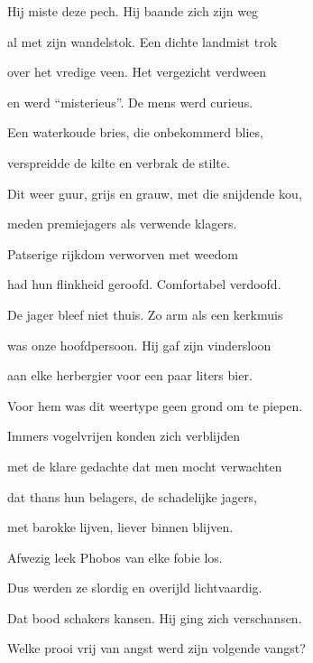 Hij miste deze pech.
Hij baande zich zijn weg

al met zijn wandelstok.
Een dichte landmist trok

over het vredige veen.
Het vergezicht verdween

en werd “misterieus”.
De mens werd curieus.

Een waterkoude bries,
die onbekommerd blies,

verspreidde de kilte
en verbrak de stilte.

Dit weer guur, grijs en grauw,
met die snijdende kou,

meden premiejagers
als verwende klagers.

Patserige rijkdom
verworven met weedom

had hun flinkheid geroofd.
Comfortabel verdoofd.

De jager bleef niet thuis.
Zo arm als een kerkmuis

was onze hoofdpersoon.
Hij gaf zijn vindersloon

aan elke herbergier
voor een paar liters bier.

Voor hem was dit weertype
geen grond om te piepen.

Immers vogelvrijen
konden zich verblijden

met de klare gedachte
dat men mocht verwachten

dat thans hun belagers,
de schadelijke jagers,

met barokke lijven,
liever binnen blijven.

Afwezig leek Phobos
van elke fobie los.

Dus werden ze slordig
en overijld lichtvaardig.

Dat bood schakers kansen.
Hij ging zich verschansen.

Welke prooi vrij van angst
werd zijn volgende vangst?

